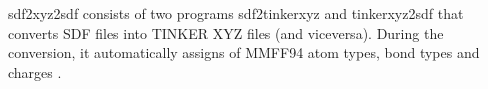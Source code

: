 sdf2xyz2sdf consists of two programs sdf2tinkerxyz and tinkerxyz2sdf that converts SDF files into TINKER XYZ files (and viceversa). During the conversion, it automatically assigns of MMFF94 atom types, bond types and charges \cite{Tosco_2011}.